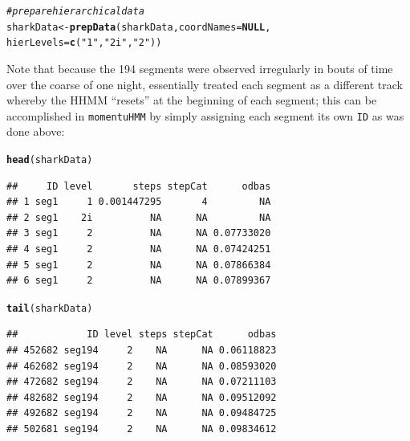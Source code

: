 \documentclass[12pt]{article}\usepackage[]{graphicx}\usepackage[]{xcolor}
\makeatletter
\newcommand{\hlsng}[1]{\textcolor[rgb]{0.192,0.494,0.8}{#1}}%
\newcommand{\hlcom}[1]{\textcolor[rgb]{0.678,0.584,0.686}{\textit{#1}}}%
\newcommand{\hldef}[1]{\textcolor[rgb]{0.345,0.345,0.345}{#1}}%
\newcommand{\hlkwa}[1]{\textcolor[rgb]{0.161,0.373,0.58}{\textbf{#1}}}%
\newcommand{\hlkwb}[1]{\textcolor[rgb]{0.69,0.353,0.396}{#1}}%
\newcommand{\hlkwc}[1]{\textcolor[rgb]{0.333,0.667,0.333}{#1}}%
\newcommand{\hlkwd}[1]{\textcolor[rgb]{0.737,0.353,0.396}{\textbf{#1}}}%
\newenvironment{kframe}{%
 \def\at@end@of@kframe{}%
 \ifinner\ifhmode%
  \def\at@end@of@kframe{\end{minipage}}%
  \begin{minipage}{\columnwidth}%
 \fi\fi%
 \def\FrameCommand##1{\hskip\@totalleftmargin \hskip-\fboxsep
 \colorbox{shadecolor}{##1}\hskip-\fboxsep
     \hskip-\linewidth \hskip-\@totalleftmargin \hskip\columnwidth}%
 \MakeFramed {\advance\hsize-\width
   \@totalleftmargin\z@ \linewidth\hsize
   \@setminipage}}%
 {\par\unskip\endMakeFramed%
 \at@end@of@kframe}
\newenvironment{knitrout}{}{} %
\makeatother
\begin{document}
\begin{knitrout}
\begin{kframe}
\begin{alltt}
\hlcom{# prepare hierarchical data}
\hldef{sharkData} \hlkwb{<-} \hlkwd{prepData}\hldef{(sharkData,}\hlkwc{coordNames}\hldef{=}\hlkwa{NULL}\hldef{,}
                      \hlkwc{hierLevels}\hldef{=}\hlkwd{c}\hldef{(}\hlsng{"1"}\hldef{,}\hlsng{"2i"}\hldef{,}\hlsng{"2"}\hldef{))}
\end{alltt}
\end{kframe}
\end{knitrout}
\noindent Note that because the 194 segments were observed irregularly in bouts of time over the coarse of one night, \cite{AdamEtAl2019} essentially treated each segment as a different track whereby the HHMM ``resets'' at the beginning of each segment; this can be accomplished in \verb|momentuHMM| by simply assigning each segment its own \verb|ID| as was done above:
\begin{knitrout}
\color{fgcolor}\begin{kframe}
\begin{alltt}
\hlkwd{head}\hldef{(sharkData)}
\end{alltt}
\begin{verbatim}
##     ID level       steps stepCat      odbas
## 1 seg1     1 0.001447295       4         NA
## 2 seg1    2i          NA      NA         NA
## 3 seg1     2          NA      NA 0.07733020
## 4 seg1     2          NA      NA 0.07424251
## 5 seg1     2          NA      NA 0.07866384
## 6 seg1     2          NA      NA 0.07899367
\end{verbatim}
\begin{alltt}
\hlkwd{tail}\hldef{(sharkData)}
\end{alltt}
\begin{verbatim}
##            ID level steps stepCat      odbas
## 452682 seg194     2    NA      NA 0.06118823
## 462682 seg194     2    NA      NA 0.08593020
## 472682 seg194     2    NA      NA 0.07211103
## 482682 seg194     2    NA      NA 0.09512092
## 492682 seg194     2    NA      NA 0.09484725
## 502681 seg194     2    NA      NA 0.09834612
\end{verbatim}
\end{kframe}
\end{knitrout}
\end{document}
